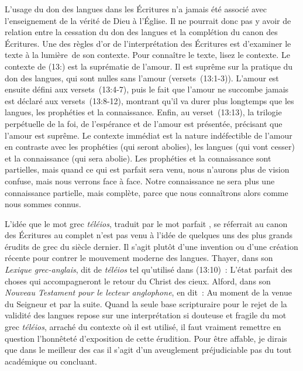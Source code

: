 L'usage du don des langues dans les Écritures n'a jamais été associé
 avec l'enseignement de la vérité de Dieu à l'Église.
 Il ne pourrait donc pas y avoir de relation entre la cessation
 du don des langues et la complétion du canon des Écritures.
 Une des règles d'or de l'interprétation des Écritures est d'examiner
 le texte à la lumière~de son contexte. Pour connaître le texte,
 lisez le contexte. Le contexte de (13:) est la suprématie
 de l'amour. Il est suprême sur la pratique du don des langues,
 qui sont nulles sans l'amour (versets~(13:1-3)).
 L'amour est ensuite défini aux versets~(13:4-7),
 puis le fait que l'amour ne succombe jamais est déclaré aux
 versets~(13:8-12), montrant qu'il va durer plus longtemps
 que les langues, les prophéties et la connaissance.
 Enfin, au verset~(13:13), la trilogie perpétuelle de la foi,
 de l'espérance et de l'amour est présentée, précisant que l'amour
 est suprême. Le contexte immédiat est la nature indéfectible de l'amour
 en contraste avec les prophéties (qui seront abolies), les langues
 (qui vont cesser) et la connaissance (qui sera abolie).
 Les prophéties et la connaissance sont partielles, mais quand ce qui
 est parfait sera venu, nous n'aurons plus de vision confuse,
 mais nous verrons face à face. Notre connaissance ne sera plus
 une connaissance partielle, mais complète, parce que nous connaîtrons
 alors comme nous sommes connus.

L'idée que le mot grec \emph{téléios}, traduit par le mot \og parfait \fg{},
 se réferrait au canon des Écritures au complet n'est pas venu
 à l'idée de quelques uns des plus grands érudits de grec du siècle dernier.
 Il s'agit plutôt d'une invention ou d'une création récente pour contrer
 le mouvement moderne des langues. Thayer, dans son
 \emph{Lexique grec-anglais},
 dit de \emph{téléios} tel qu'utilisé dans (13:10)~:
 \og L'état parfait des choses qui accompagneront le retour du Christ
 des cieux. \fg{} Alford, dans son \emph{Nouveau Testament pour le lecteur
 anglophone}, en dit~: \og Au moment de la venue du Seigneur et par la suite. \fg{}
 Quand la seule base scripturaire pour le rejet de la validité des langues
 repose sur une interprétation si douteuse et fragile du mot grec
 \emph{téléios}, arraché du contexte où il est utilisé, il faut vraiment
 remettre en question l'honnêteté d'exposition de cette érudition.
 Pour être affable, je dirais que dans le meilleur des cas il s'agit
 d'un aveuglement préjudiciable \ocadr pas du tout académique ou concluant.

